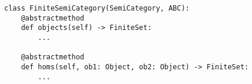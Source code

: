 \par\begin{minipage}{60ex}
\begin{verbatim}
class FiniteSemiCategory(SemiCategory, ABC):
    @abstractmethod
    def objects(self) -> FiniteSet:
        ...

    @abstractmethod
    def homs(self, ob1: Object, ob2: Object) -> FiniteSet:
        ...
\end{verbatim}
\end{minipage}\par